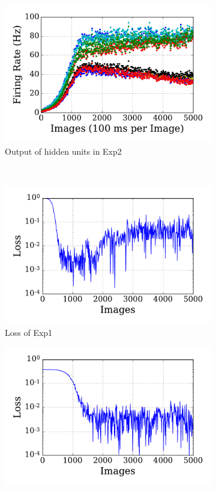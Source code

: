 \begin{figure}
\begin{subfigure}[t]{0.48\textwidth}
		\includegraphics[width=\textwidth]{pics_sdlm/15_exp_SRBM_teach_long/exp2_hid_s.pdf}
		\caption{Output of hidden units in Exp2}
	\end{subfigure}\\
	\begin{subfigure}[t]{0.48\textwidth}
		\includegraphics[width=\textwidth]{pics_sdlm/15_exp_SRBM_teach_long/exp1_mse_nons.pdf}
		\caption{Loss of Exp1}
	\end{subfigure}
	\begin{subfigure}[t]{0.48\textwidth}
		\includegraphics[width=\textwidth]{pics_sdlm/15_exp_SRBM_teach_long/exp2_mse_nons.pdf}

\end{subfigure}
\end{figure}
